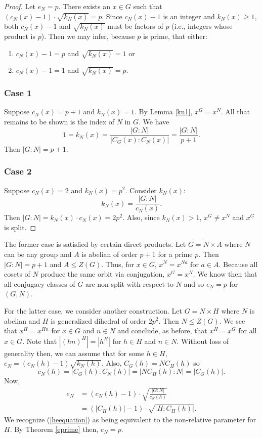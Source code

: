 \documentclass[main.tex]{subfiles}
\begin{document}
\begin{proof}
Let $e_N = p$. There exists an $x \in G$ such that $(c_N(x) - 1) \cdot \sqrt{k_N(x)} = p$. Since $c_N(x) - 1$ is an integer and $k_N(x) \ge 1$, both $c_N(x) - 1$ and $\sqrt{k_N(x)}$ must be factors of $p$ (i.e., integers whose product is $p$). Then we may infer, because $p$ is prime, that either:
\begin{enumerate}
	\item $c_N(x) - 1 = p$ and $\sqrt{k_N(x)} = 1$ or
	\item $c_N(x) - 1 = 1$ and $\sqrt{k_N(x)} = p$.
\end{enumerate}

\subsubsection*{Case 1} Suppose $c_N(x) = p + 1$ and $k_N(x) = 1$. By Lemma \ref{kn1}, $x^G = x^N$. All that remains to be shown is the index of $N$ in $G$. We have
$$1 = k_N(x) = \frac{|G : N|}{|C_G(x):C_N(x)|} = \frac{|G : N|}{p + 1}\text{.}$$
Then $|G:N| = p+1$.

\subsubsection*{Case 2} Suppose $c_N(x) = 2$ and $k_N(x) = p^2$. Consider $k_N(x)$:
$$k_N(x) = \frac{|G:N|}{c_N(x)}\text{.}$$
Then $|G:N| = k_N(x) \cdot c_N(x) = 2p^2$. Also, since $k_N(x) > 1$, $x^G \ne x^N$ and $x^G$ is split.
\end{proof}

The former case is satisfied by certain direct products. Let $G = N \times A$ where $N$ can be any group and $A$ is abelian of order $p+1$ for a prime $p$. Then $|G : N| = p + 1$ and $A \le Z(G)$. Thus, for $x \in G$, $x^N = x^{Na}$ for $a \in A$. Because all cosets of $N$ produce the same orbit via conjugation, $x^G = x^N$. We know then that all conjugacy classes of $G$ are non-split with respect to $N$ and so $e_N = p$ for $(G, N)$.

For the latter case, we consider another construction. Let $G = N \times H$ where $N$ is abelian and $H$ is generalized dihedral of order $2p^2$. Then $N \le Z(G)$. We see that $x^H = x^{Hn}$ for $x \in G$ and $n \in N$ and conclude, as before, that $x^H = x^G$ for all $x \in G$. Note that $|(hn)^H| = |h^H|$ for $h \in H$ and $n \in N$. Without loss of generality then, we can assume that for some $h \in H$, $e_N = (c_N(h) - 1) \sqrt{k_N(h)}$. Also, $C_G(h) = N C_H(h)$ so
$$c_N(h) = |C_G(h) : C_N(h)| = |N C_H(h) : N| = |C_G(h)| \text{.}$$
Now,
\begin{align}
e_N &= (c_N(h) - 1) \cdot \sqrt{\frac{|G:N|}{c_N(h)}}\nonumber \\
&= (|C_H(h)| - 1) \cdot \sqrt{|H : C_H(h)|}\label{heequation} \text{.}
\end{align}
We recognize (\ref{heequation}) as being equivalent to the non-relative parameter for $H$. By Theorem \ref{eprime} then, $e_N = p$.
\end{document}
